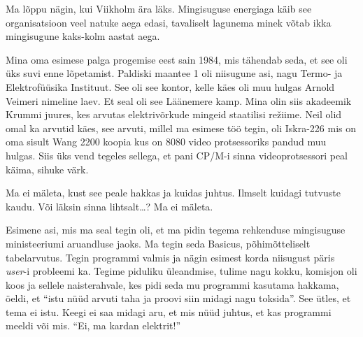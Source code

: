
Ma lõppu nägin, kui Viikholm ära läks. Mingisuguse energiaga käib see organisatsioon veel natuke aega edasi, tavaliselt lagunema minek võtab ikka mingisugune kaks-kolm aastat aega.


Mina oma esimese palga progemise eest sain 1984,  mis tähendab seda, et see oli üks suvi enne lõpetamist. Paldiski maantee 1 oli niisugune asi, nagu Termo- ja Elektrofüüsika Instituut. See oli see kontor, kelle käes oli muu hulgas Arnold Veimeri nimeline laev. Et seal oli see Läänemere kamp. Mina olin siis  akadeemik Krummi juures, kes arvutas elektrivõrkude mingeid staatilisi režiime. Neil olid omal  ka arvutid käes, see arvuti, millel ma esimese töö tegin, oli Iskra-226 mis on oma sisult Wang 2200 koopia  kus on 8080 video protsessoriks pandud muu hulgas. Siis üks vend tegeles sellega, et pani CP/M-i sinna videoprotsessori peal käima, sihuke värk. 


Ma ei mäleta, kust see  peale hakkas ja kuidas juhtus. Ilmselt kuidagi tutvuste kaudu. Või läksin sinna lihtsalt\ldots?  Ma ei mäleta.


Esimene asi, mis ma seal tegin oli, et ma pidin  tegema rehkenduse mingisuguse ministeeriumi aruandluse jaoks. Ma tegin seda Basicus, põhimõtteliselt tabelarvutus. Tegin  programmi valmis ja  nägin esimest korda niisugust päris \emph{user}-i probleemi ka. Tegime piduliku üleandmise, tulime nagu kokku, komisjon oli koos ja sellele naisterahvale, kes pidi seda mu programmi kasutama hakkama, öeldi, et \enquote{istu nüüd arvuti taha ja proovi siin midagi nagu toksida}. See ütles, et tema ei istu. Keegi ei saa midagi aru, et mis nüüd juhtus, et kas programmi meeldi või mis. \enquote{Ei, ma kardan elektrit!}

